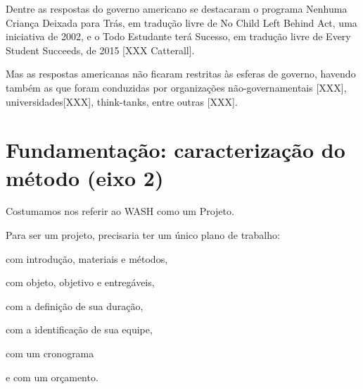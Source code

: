 \documentclass[
12pt,		%
openright,	%
twoside,  %
a4paper,			%
chapter=TITLE,		%
english,			%
french,				%
spanish,			%
brazil				%
]{USPSC-classe/USPSC}
\begin{document}
Dentre as respostas do governo americano se destacaram o programa \textquotedbl Nenhuma Crian\c{c}a Deixada para Tr\'as, em tradu\c{c}\~ao livre de \textquotedbl No Child Left Behind Act, uma iniciativa de 2002, e o \textquotedbl Todo Estudante ter\'a Sucesso, em tradu\c{c}\~ao livre de \textquotedbl Every Student Succeeds, de 2015 [XXX Catterall].














Mas as respostas americanas n\~ao ficaram restritas \`as esferas de governo, havendo tamb\'em as que foram conduzidas por organiza\c{c}\~oes n\~ao-governamentais [XXX], universidades[XXX], think-tanks, entre outras [XXX].














\section[Fundamenta\c{c}\~ao: caracteriza\c{c}\~ao do m\'etodo (eixo 2)]{Fundamenta\c{c}\~ao: caracteriza\c{c}\~ao do m\'etodo (eixo 2)}\label{Fundamenta\c{c}\~ao: caracteriza\c{c}\~ao do m\'etodo (eixo 2)}
Costumamos nos referir ao WASH como um Projeto.














Para ser um projeto, precisaria ter um \'unico plano de trabalho:















\begin{alineas}
\item com introdu\c{c}\~ao, materiais e m\'etodos,
\item com objeto, objetivo e entreg\'aveis,
\item com a defini\c{c}\~ao de sua dura\c{c}\~ao,
\item com a identifica\c{c}\~ao de sua equipe,
\item com um cronograma
\item e com um or\c{c}amento.
\end{alineas}
\end{document}
